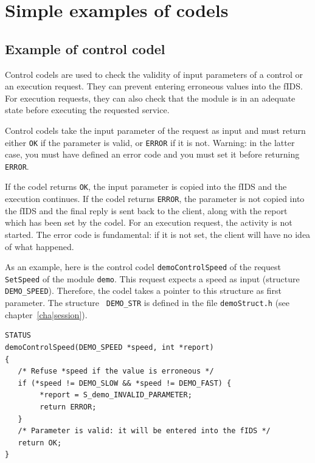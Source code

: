 \section{Simple examples of codels}

\subsection{Example of control codel}
\label{ssec|control|ex}

Control codels are used  to check the  validity of input parameters  of a
control  or  an execution request.    They can prevent entering erroneous
values  into the fIDS. For execution  requests, they can  also check that
the  module  is in   an adequate  state before  executing  the  requested
service.

Control codels take the input parameter of the  request as input and must
return either {\tt OK} if the parameter is valid, or {\tt ERROR} if it is
not. Warning: in the latter case, you must have defined an error code and
you must set it before returning {\tt ERROR}.

If the  codel returns {\tt  OK}, the  input parameter  is copied into the
fIDS and the execution  continues. If the  codel returns {\tt ERROR}, the
parameter is not copied into the fIDS and the final reply is sent back to
the client, along with the report which has been set by the codel. For an
execution  request,  the  activity is  not  started.   The error code  is
fundamental: if it is  not  set, the client   will have no idea  of  what
happened.

As an example, here  is the control  codel {\tt demoControlSpeed} of  the
request {\tt SetSpeed} of the module {\tt  demo}.  This request expects a
speed as input (structure {\tt DEMO\_SPEED}).  Therefore, the codel takes
a pointer   to  this structure as  first  parameter.   The structure {\tt
DEMO\_STR}  is   defined    in  the    file  {\tt   demoStruct.h}    (see
chapter~\ref{cha|session}).

\begin{center}\begin{cartouche}\small\begin{verbatim}
STATUS
demoControlSpeed(DEMO_SPEED *speed, int *report)
{
   /* Refuse *speed if the value is erroneous */
   if (*speed != DEMO_SLOW && *speed != DEMO_FAST) {
        *report = S_demo_INVALID_PARAMETER;
        return ERROR;
   }
   /* Parameter is valid: it will be entered into the fIDS */
   return OK;
}
\end{verbatim}\end{cartouche}\end{center}

